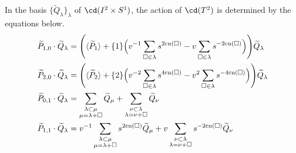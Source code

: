 \begin{proposition} \label{prop:generatoractions}
In the basis $\{ \widetilde{Q}_\lambda \}_\lambda$ of $\cd(I^2 \times S^1)$, the action of $\cd(T^2)$ is determined by the equations below.
\begin{align}
    \widetilde{P}_{1,0} \cdot \widetilde{Q}_\lambda &= \Bigg(\langle \widetilde{P}_1 \rangle + \{1\} \Big( v^{-1}\sum_{\square\in\lambda} s^{2\mathrm{cn}(\square)} - v \sum_{\square\in\lambda} s^{-2\mathrm{cn}(\square)} \Big) \Bigg) \widetilde{Q}_\lambda \label{eq:1,0}\\
    \widetilde{P}_{2,0} \cdot \widetilde{Q}_\lambda &= \Bigg(\langle \widetilde{P}_2 \rangle + \{2\} \Big( v^{-2}\sum_{\square\in\lambda} s^{4\mathrm{cn}(\square)} - v^2 \sum_{\square\in\lambda} s^{-4\mathrm{cn}(\square)} \Big) \Bigg) \widetilde{Q}_\lambda \label{eq:2,0}\\
    \widetilde{P}_{0,1} \cdot \widetilde{Q}_\lambda &= \sum_{\substack{\lambda \subset \mu \\ \mu = \lambda + \square}} \widetilde{Q}_\mu + \sum_{\substack{\nu \subset \lambda \\ \lambda = \nu + \square}} \widetilde{Q}_\nu \label{eq:0,1}\\
    \widetilde{P}_{1,1} \cdot \widetilde{Q}_\lambda &= v^{-1} \sum_{\substack{\lambda \subset \mu \\ \mu = \lambda + \square}} s^{2\mathrm{cn}(\square)} \widetilde{Q}_\mu + v \sum_{\substack{\nu \subset \lambda \\ \lambda = \nu + \square}} s^{-2\mathrm{cn}(\square)} \widetilde{Q}_\nu \label{eq:1,1}
\end{align}
\end{proposition}
